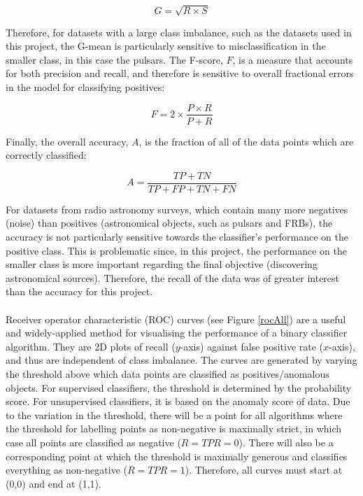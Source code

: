 \documentclass[12pt]{article}
\begin{document}
\begin{equation}
G = \sqrt{R \times S}
\label{gmean}
\end{equation}

Therefore, for datasets with a large class imbalance, such as the datasets used in this project, the G-mean is particularly sensitive to misclassification in the smaller class, in this case the pulsars. The F-score, $F$, is a measure that accounts for both precision and recall, and therefore is sensitive to overall fractional errors in the model for classifying positives:

\begin{equation}
F = 2 \times \frac{P \times R}{P+R}
\label{fscore}
\end{equation}

Finally, the overall accuracy, $A$, is the fraction of all of the data points which are correctly classified:

\begin{equation}
A = \frac{TP+TN}{TP+FP+TN+FN}
\label{accu}
\end{equation}

For datasets from radio astronomy surveys, which contain many more negatives (noise) than positives (astronomical objects, such as pulsars and FRBs), the accuracy is not particularly sensitive towards the classifier's performance on the positive class. This is problematic since, in this project, the performance on the smaller class is more important regarding the final objective (discovering astronomical sources). Therefore, the recall of the data was of greater interest than the accuracy for this project.
\paragraph{}
Receiver operator characteristic (ROC) curves (see Figure \ref{rocAll}) are a useful and widely-applied method for visualising the performance of a binary classifier algorithm. They are 2D plots of recall ($y$-axis) against false positive rate ($x$-axis), and thus are independent of class imbalance. The curves are generated by varying the threshold above which data points are classified as positives/anomalous objects. For supervised classifiers, the threshold is determined by the probability score. For unsupervised classifiers, it is based on the anomaly score of data. Due to the variation in the threshold, there will be a point for all algorithms where the threshold for labelling points as non-negative is maximally strict, in which case all points are classified as negative ($R = TPR = 0$). There will also be a corresponding point at which the threshold is maximally generous and classifies everything as non-negative ($R = TPR = 1$). Therefore, all curves must start at (0,0) and end at (1,1).
\end{document}
